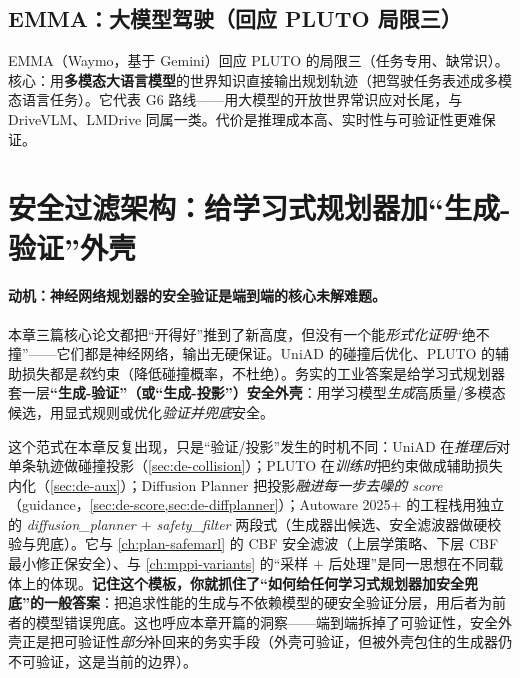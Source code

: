 \subsection{EMMA：大模型驾驶（回应 PLUTO 局限三）}
\label{sec:de-emma}

EMMA\cite{hwang2024emma}（Waymo，基于 Gemini）回应 PLUTO 的局限三（任务专用、缺常识）。核心：用\textbf{多模态大语言模型}的世界知识直接输出规划轨迹（把驾驶任务表述成多模态语言任务）。它代表 G6 路线——用大模型的开放世界常识应对长尾，与 DriveVLM、LMDrive 同属一类。代价是推理成本高、实时性与可验证性更难保证。

\section{安全过滤架构：给学习式规划器加“生成-验证”外壳}
\label{sec:de-safety}

\paragraph{动机：神经网络规划器的安全验证是端到端的核心未解难题。}
本章三篇核心论文都把“开得好”推到了新高度，但没有一个能\emph{形式化证明}“绝不撞”——它们都是神经网络，输出无硬保证。UniAD 的碰撞后优化、PLUTO 的辅助损失都是\emph{软}约束（降低碰撞概率，不杜绝）。务实的工业答案是给学习式规划器套一层\textbf{“生成-验证”（或“生成-投影”）安全外壳}：用学习模型\emph{生成}高质量/多模态候选，用显式规则或优化\emph{验证并兜底}安全。

\begin{insight}[“生成-验证”是贯穿全章的统一范式]
这个范式在本章反复出现，只是“验证/投影”发生的时机不同：UniAD 在\emph{推理后}对单条轨迹做碰撞投影（\cref{sec:de-collision}）；PLUTO 在\emph{训练时}把约束做成辅助损失内化（\cref{sec:de-aux}）；Diffusion Planner 把投影\emph{融进每一步去噪的 score}（guidance，\cref{sec:de-score,sec:de-diffplanner}）；Autoware 2025+ 的工程栈用独立的 \emph{diffusion\_planner $+$ safety\_filter} 两段式（生成器出候选、安全滤波器做硬校验与兜底）。它与 \cref{ch:plan-safemarl} 的 CBF 安全滤波（上层学策略、下层 CBF 最小修正保安全）、与 \cref{ch:mppi-variants} 的“采样 $+$ 后处理”是同一思想在不同载体上的体现。\textbf{记住这个模板，你就抓住了“如何给任何学习式规划器加安全兜底”的一般答案}：把追求性能的生成与不依赖模型的硬安全验证分层，用后者为前者的模型错误兜底。这也呼应本章开篇的洞察——端到端拆掉了可验证性，安全外壳正是把可验证性\emph{部分}补回来的务实手段（外壳可验证，但被外壳包住的生成器仍不可验证，这是当前的边界）。
\end{insight}

